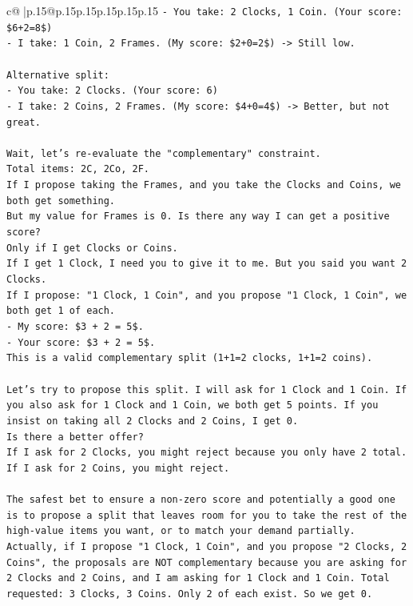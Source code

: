 \documentclass{article}
\begin{document}
{\begin{supertabular}{c@{$\;$}|p{.15\linewidth}@{}p{.15\linewidth}p{.15\linewidth}p{.15\linewidth}p{.15\linewidth}p{.15\linewidth}}
{{{\texttt{{-} You take: 2 Clocks, 1 Coin. (Your score: \$6+2=8\$)} \\
\texttt{{-} I take: 1 Coin, 2 Frames. (My score: \$2+0=2\$) {-}> Still low.} \\
\\ 
\texttt{Alternative split:} \\
\texttt{{-} You take: 2 Clocks. (Your score: 6)} \\
\texttt{{-} I take: 2 Coins, 2 Frames. (My score: \$4+0=4\$) {-}> Better, but not great.} \\
\\ 
\texttt{Wait, let's re{-}evaluate the "complementary" constraint.} \\
\texttt{Total items: 2C, 2Co, 2F.} \\
\texttt{If I propose taking the Frames, and you take the Clocks and Coins, we both get something.} \\
\texttt{But my value for Frames is 0. Is there any way I can get a positive score?} \\
\texttt{Only if I get Clocks or Coins.} \\
\texttt{If I get 1 Clock, I need you to give it to me. But you said you want 2 Clocks.} \\
\texttt{If I propose: "1 Clock, 1 Coin", and you propose "1 Clock, 1 Coin", we both get 1 of each.} \\
\texttt{{-} My score: \$3 + 2 = 5\$.} \\
\texttt{{-} Your score: \$3 + 2 = 5\$.} \\
\texttt{This is a valid complementary split (1+1=2 clocks, 1+1=2 coins).} \\
\\ 
\texttt{Let's try to propose this split. I will ask for 1 Clock and 1 Coin. If you also ask for 1 Clock and 1 Coin, we both get 5 points. If you insist on taking all 2 Clocks and 2 Coins, I get 0.} \\
\texttt{Is there a better offer?} \\
\texttt{If I ask for 2 Clocks, you might reject because you only have 2 total.} \\
\texttt{If I ask for 2 Coins, you might reject.} \\
\\ 
\texttt{The safest bet to ensure a non{-}zero score and potentially a good one is to propose a split that leaves room for you to take the rest of the high{-}value items you want, or to match your demand partially.} \\
\texttt{Actually, if I propose "1 Clock, 1 Coin", and you propose "2 Clocks, 2 Coins", the proposals are NOT complementary because you are asking for 2 Clocks and 2 Coins, and I am asking for 1 Clock and 1 Coin. Total requested: 3 Clocks, 3 Coins. Only 2 of each exist. So we get 0.} \\
}}}
\end{supertabular}}
\end{document}
